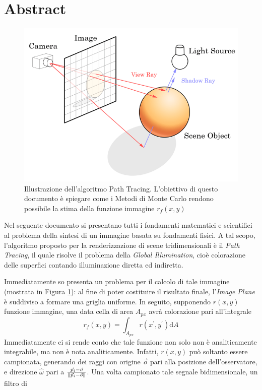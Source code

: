 \documentclass[10pt, openany]{book}
\theoremstyle{theoremdd}
\begin{document}
	\section*{Abstract}
	\begin{figure}[t]
		\centering
		\includegraphics[width=0.6\linewidth]{./assets/intro_path_tracing_online_tech_tips.png}
		\caption{Illustrazione dell'algoritmo Path Tracing. L'obiettivo di questo documento \`e spiegare come i Metodi di Monte Carlo rendono 
			possibile la stima della funzione immagine $r_f(x,y)$}
		\label{intro:pathTracing}
	\end{figure}
	Nel seguente documento si presentano tutti i fondamenti matematici e scientifici al problema della sintesi di un immagine basata su fondamenti 
	fisici. A tal scopo, l'algoritmo proposto per la renderizzazione di scene tridimensionali \`e il \textit{Path Tracing}, il quale risolve il problema
	della \textit{Global Illumination}, cio\`e colorazione delle superfici contando illuminazione diretta ed indiretta.\par
	Immediatamente so presenta un problema per il calcolo di tale immagine (mostrata in Figura \ref{intro:pathTracing}): al fine di poter costituire 
	il risultato finale, l'\textit{Image Plane} \`e suddiviso a formare una griglia uniforme. In seguito, supponendo $r(x,y)$ funzione immagine,
	una data cella di area $A_{px}$ avr\`a colorazione pari all'integrale 
	\begin{equation}
		r_f(x,y)=\int_{A_{px}}r(x^\prime,y^\prime)\mathrm{d}A
	\end{equation}
	Immediatamente ci si rende conto che tale funzione non solo non \`e analiticamente integrabile, ma non \`e nota analiticamente. Infatti, $r(x,y)$
	pu\`o soltanto essere campionata, generando dei raggi con origine $\vec{o}$ pari alla posizione dell'osservatore, e direzione $\hat{\omega}$
	pari a $\mathmakebox{\tfrac{\vec{p}_i-\vec{o}}{\norm{\vec{p}_i-\vec{o}}}}$. Una volta campionato tale segnale bidimensionale, un filtro di
\end{document}
